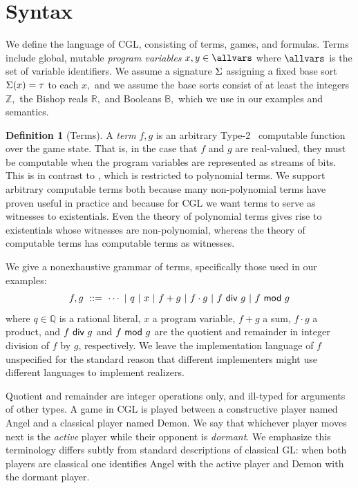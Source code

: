 \documentclass[12pt]{cmuthesis}
\theoremstyle{definition}
\newtheorem{definition}{Definition}
\theoremstyle{remark}
\newcommand{\bebecomes}{\mathrel{::=}}
\newcommand{\alternative}{~|~}
\newcommand{\rref}[2][]{\prettyref{#2}}
\newcommand{\CGL}{\textsf{CGL}\xspace}
\newcommand{\GL}{GL\xspace}
\begin{document}
\section{Syntax}
We define the language of \CGL, consisting of terms, games, and formulas.
Terms include global, mutable \emph{program variables} $x, y \in \allvars$ where $\allvars$ is the set of variable identifiers.
We assume a signature $\Sigma$ assigning a fixed base sort $\Sigma(x) = \tau$ to each $x,$ and we assume the base sorts consist of at least the integers $\mathbb{Z},$ the Bishop reals $\mathbb{R},$ and Booleans $\mathbb{B},$ which we use in our examples and semantics.
\begin{definition}[Terms]
A \emph{term} $f, g$ is an arbitrary Type-2~\cite{DBLP:series/txtcs/Weihrauch00} computable function over the game state.
That is, in the case that $f$ and $g$ are real-valued, they must be computable when the program variables are represented as streams of bits.
This is in contrast to \dGL, which is restricted to polynomial terms.
We support arbitrary computable terms both because many non-polynomial terms have proven useful in practice and because for \CGL we want terms to serve as witnesses to existentials.
Even the theory of polynomial terms gives rise to existentials whose witnesses are non-polynomial, whereas the theory of computable terms has computable terms as witnesses.

We give a nonexhaustive grammar of terms, specifically those used in our examples:
\[f,g ~\bebecomes~  \cdots \alternative q \alternative x \alternative f + g \alternative f \cdot g \alternative \ediv{f}{g} \alternative \emod{f}{g}\]
where $q \in \mathbb{Q}$ is a rational literal, $x$ a program variable, $f + g$ a sum, $f \cdot g$ a product, and $f~\textsf{div}~g$ and $f~\textsf{mod}~g$ are the quotient and remainder in integer division of $f$ by $g$, respectively.
We leave the implementation language of $f$ unspecified for the standard reason that different implementers might use different languages to implement realizers.
\label{def:terms}
 \end{definition}
Quotient and remainder are integer operations only, and ill-typed for arguments of other types.
A game in \CGL is played between a constructive player named Angel and a classical player named Demon.
We say that whichever player moves next is the \emph{active} player while their opponent is \emph{dormant}.
We emphasize this terminology differs subtly from standard descriptions of classical \GL: when both players are classical one identifies Angel with the active player and Demon with the dormant player.
\end{document}
